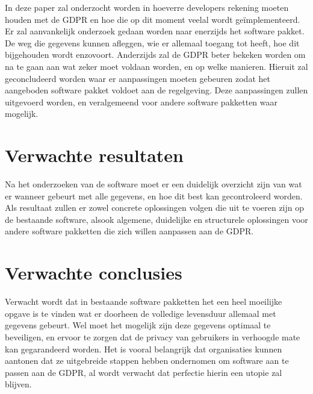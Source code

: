 In deze paper zal onderzocht worden in hoeverre developers rekening moeten houden met de GDPR en hoe die op dit moment veelal wordt geïmplementeerd. Er zal aanvankelijk onderzoek gedaan worden naar enerzijds het software pakket. De weg die gegevens kunnen afleggen, wie er allemaal toegang tot heeft, hoe dit bijgehouden wordt enzovoort. Anderzijds zal de GDPR beter bekeken worden om na te gaan aan wat zeker moet voldaan worden, en op welke manieren. Hieruit zal geconcludeerd worden waar er aanpassingen moeten gebeuren zodat het aangeboden software pakket voldoet aan de regelgeving. Deze aanpassingen zullen uitgevoerd worden, en veralgemeend voor andere software pakketten waar mogelijk.  

\section{Verwachte resultaten}
\label{sec:verwachte_resultaten}
Na het onderzoeken van de software moet er een duidelijk overzicht zijn van wat er wanneer gebeurt met alle gegevens, en hoe dit best kan gecontroleerd worden. Als resultaat zullen er zowel concrete oplossingen volgen die uit te voeren zijn op de bestaande software, alsook algemene, duidelijke en structurele oplossingen voor andere software pakketten die zich willen aanpassen aan de GDPR. 

\section{Verwachte conclusies}
\label{sec:verwachte_conclusies}

 
Verwacht wordt dat in bestaande software pakketten het een heel moeilijke opgave is te vinden wat er doorheen de volledige levensduur allemaal met gegevens gebeurt. Wel moet het mogelijk zijn deze gegevens optimaal te beveiligen, en ervoor te zorgen dat de privacy van gebruikers in verhoogde mate kan gegarandeerd worden. Het is vooral belangrijk dat organisaties kunnen aantonen dat ze uitgebreide stappen hebben ondernomen om software aan te passen aan de GDPR, al wordt verwacht dat perfectie hierin een utopie zal blijven.  

